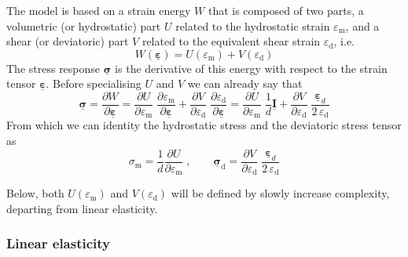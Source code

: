 \documentclass[times,namecite]{goose-article}
\newcommand\T[1]{\underline{\bm{{#1}}}}
\begin{document}
The model is based on a strain energy $W$ that is composed of two parts, a volumetric (or hydrostatic) part $U$ related to the hydrostatic strain $\varepsilon_\mathrm{m}$, and a shear (or deviatoric) part $V$ related to the equivalent shear strain $\varepsilon_\mathrm{d}$, i.e.\
\begin{equation}
  W ( \T{\varepsilon} ) = U ( \varepsilon_\mathrm{m} ) + V ( \varepsilon_\mathrm{d} )
\end{equation}
The stress response $\T{\sigma}$ is the derivative of this energy with respect to the strain tensor $\T{\varepsilon}$. Before specialising $U$ and $V$ we can already say that
\begin{equation}\label{eq:dU-dV:elas}
  \T{\sigma}
  =
  \frac{\partial W}{\partial \T{\varepsilon}}
  =
  \frac{\partial U}{\partial \varepsilon_\mathrm{m}} \;
  \frac{\partial \varepsilon_\mathrm{m}}{\partial \T{\varepsilon}}
  +
  \frac{\partial V}{\partial \varepsilon_\mathrm{d}} \;
  \frac{\partial \varepsilon_\mathrm{d}}{\partial \T{\varepsilon}}
  =
  \frac{\partial U}{\partial \varepsilon_\mathrm{m}} \;
  \frac{1}{d} \T{I}
  +
  \frac{\partial V}{\partial \varepsilon_\mathrm{d}} \;
  \frac{\T{\varepsilon}_d}{2 \, \varepsilon_\mathrm{d}}
\end{equation}
From which we can identity the hydrostatic stress and the deviatoric stress tensor as
\begin{equation}\label{stress:generic}
  \sigma_\mathrm{m} = \frac{1}{d} \frac{\partial U}{\partial \varepsilon_\mathrm{m}}
  \;, \qquad
  \T{\sigma}_\mathrm{d}
  =
  \frac{\partial V}{\partial \varepsilon_\mathrm{d}} \;
  \frac{\T{\varepsilon}_d}{2 \, \varepsilon_\mathrm{d}}
\end{equation}

Below, both $U(\varepsilon_\mathrm{m})$ and $V(\varepsilon_\mathrm{d})$ will be defined by slowly increase complexity, departing from linear elasticity.

\subsubsection{Linear elasticity}
\end{document}
